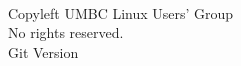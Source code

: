 \documentclass[11pt]{article}
\begin{document}
\begin{multicols*}{2}
~

\phantom{x}
\vfill
\begin{center} \tiny
    \textcopyleft{} Copyleft \the\year{} UMBC Linux Users' Group \\
    No rights reserved. \\
    Git Version 
\end{center}
\end{multicols*}
\end{document}
